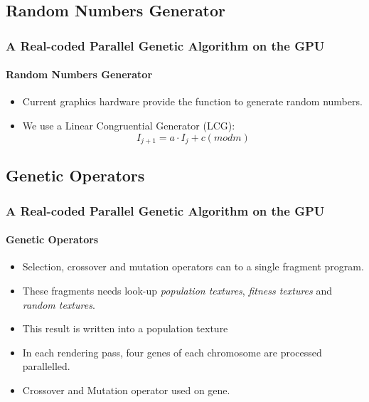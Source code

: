 \subsection{Random Numbers Generator}
\frame
{
\frametitle{A Real-coded Parallel Genetic Algorithm on the GPU}
\framesubtitle{Random Numbers Generator}
\begin{itemize}
	\item Current graphics hardware  provide the function to generate random numbers.
	\item We use a Linear Congruential Generator (LCG):
	$$I_{j+1} = a\cdot I_{j} + c (mod m)$$
\end{itemize}
}
\subsection{Genetic Operators}
\frame
{
\frametitle{A Real-coded Parallel Genetic Algorithm on the GPU}
\framesubtitle{Genetic Operators}
\begin{itemize}
	\item Selection, crossover and mutation operators can  to a single fragment program.
	\item These fragments needs look-up \emph{population textures}, \emph{fitness textures} and \emph{random textures}.
	\item This result is written into a  population texture
	\item In each rendering pass, four genes of each chromosome are processed parallelled.
	\item Crossover and Mutation operator used on  gene.
\end{itemize}
}

